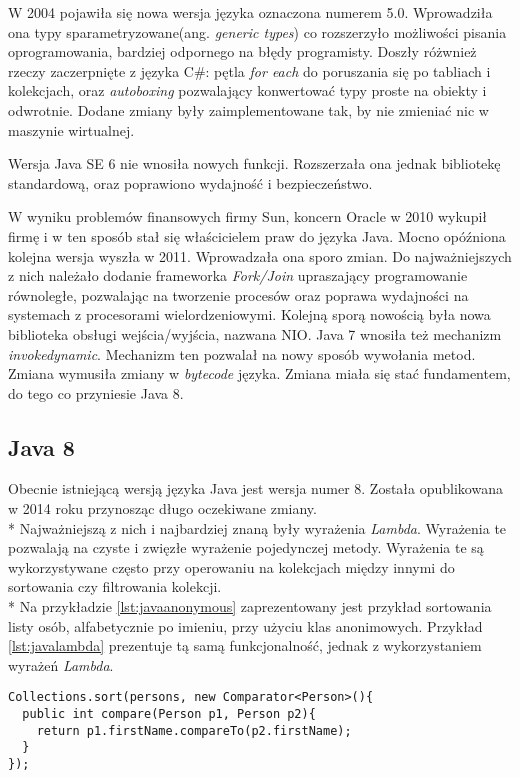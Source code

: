 W 2004 pojawiła się nowa wersja języka oznaczona numerem 5.0. Wprowadziła ona typy sparametryzowane(ang. \textsl{generic types}) co rozszerzyło możliwości pisania oprogramowania, bardziej odpornego na błędy programisty. Doszły różwnież rzeczy zaczerpnięte z języka C\#: pętla \textsl{for each} do poruszania się po tabliach i kolekcjach, oraz \textsl{autoboxing} pozwalający konwertować typy proste na obiekty i odwrotnie. Dodane zmiany były zaimplementowane tak, by nie zmieniać nic w maszynie wirtualnej.

Wersja Java SE 6 nie wnosiła nowych funkcji. Rozszerzała ona jednak bibliotekę standardową, oraz poprawiono wydajność i bezpieczeństwo.

W wyniku problemów finansowych firmy Sun, koncern Oracle w 2010 wykupił firmę i w ten sposób stał się właścicielem praw do języka Java. Mocno opóźniona kolejna wersja wyszła w 2011. Wprowadzała ona sporo zmian. Do najważniejszych z nich należało dodanie frameworka \textsl{Fork/Join} upraszający programowanie równoległe, pozwalając na tworzenie procesów oraz poprawa wydajności na systemach z procesorami wielordzeniowymi. Kolejną sporą nowością była nowa biblioteka obsługi wejścia/wyjścia, nazwana NIO. Java 7 wnosiła też mechanizm \textsl{invokedynamic}. Mechanizm ten pozwalał na nowy sposób wywołania metod. Zmiana wymusiła zmiany w \textsl{bytecode} języka. Zmiana miała się stać fundamentem, do tego co przyniesie Java 8.

\subsection{Java 8}
Obecnie istniejącą wersją języka Java jest wersja numer 8. Została opublikowana w 2014 roku przynosząc długo oczekiwane zmiany.\\*
Najważniejszą z nich i najbardziej znaną były wyrażenia \textsl{Lambda}. Wyrażenia te pozwalają na czyste i zwięzłe wyrażenie pojedynczej metody. Wyrażenia te są wykorzystywane często przy operowaniu na kolekcjach między innymi do sortowania czy filtrowania kolekcji.\\*
Na przykładzie \ref{lst:javaanonymous} zaprezentowany jest przykład sortowania listy osób, alfabetycznie po imieniu, przy użyciu klas anonimowych. Przykład \ref{lst:javalambda} prezentuje tą samą funkcjonalność, jednak z wykorzystaniem wyrażeń \textsl{Lambda}. 

\begin{lstlisting}[caption=Sortowanie kolekcji w języku Java przy użyciu klas anonimowych, label={lst:javaanonymous}]
Collections.sort(persons, new Comparator<Person>(){
  public int compare(Person p1, Person p2){
    return p1.firstName.compareTo(p2.firstName);
  }
});
\end{lstlisting}


